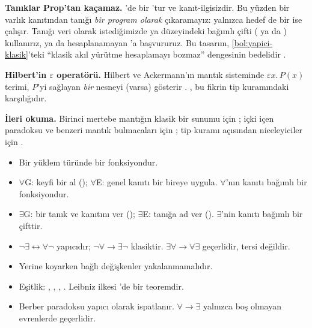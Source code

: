 \begin{arastirmanotu}
\textbf{Tanıklar Prop'tan kaçamaz.} \Lean{}'de  bir
'tur ve  kanıt-ilgisizdir. Bu yüzden bir varlık
kanıtından tanığı \emph{bir program olarak} çıkaramayız: 
yalnızca hedef de bir  ise çalışır. Tanığı veri olarak
istediğimizde ya  düzeyindeki bağımlı çifti ( ya da
) kullanırız, ya da hesaplanamayan
'a başvururuz. Bu tasarım, \cref{bol:yapici-klasik}'teki
``klasik akıl yürütme hesaplamayı bozmaz'' dengesinin bedelidir
\citep{carneiro2019}.

\textbf{Hilbert'in $\varepsilon$ operatörü.} Hilbert ve Ackermann'ın
mantık sisteminde $\varepsilon x.\,P(x)$ terimi, $P$'yi sağlayan
\emph{bir} nesneyi (varsa) gösterir \citep{hilbert1928}.
, bu fikrin tip kuramındaki karşılığıdır.

\textbf{İleri okuma.} Birinci mertebe mantığın klasik bir sunumu için
\citet{vandalen2013}; içki içen paradoksu ve benzeri mantık bulmacaları
için \citet{smullyan1978}; tip kuramı açısından niceleyiciler için
\citet{nederpelt2014}.
\end{arastirmanotu}

\begin{bolumozeti}
\begin{itemize}
  \item Bir yüklem  türünde bir fonksiyondur.
  \item $\forall$G: keyfi bir  al (); $\forall$E:
        genel kanıtı bir bireye uygula. $\forall$'nın kanıtı bağımlı bir
        fonksiyondur.
  \item $\exists$G: bir tanık ve kanıtını ver (); $\exists$E:
        tanığa ad ver (). $\exists$'nin kanıtı bağımlı
        bir çifttir.
  \item $\neg\exists \leftrightarrow \forall\neg$ yapıcıdır;
        $\neg\forall \to \exists\neg$ klasiktir. $\exists\forall \to
        \forall\exists$ geçerlidir, tersi değildir.
  \item Yerine koyarken bağlı değişkenler yakalanmamalıdır.
  \item Eşitlik: , , , . Leibniz ilkesi
        \Lean{}'de bir teoremdir.
  \item Berber paradoksu yapıcı olarak ispatlanır. $\forall \to \exists$
        yalnızca boş olmayan evrenlerde geçerlidir.
\end{itemize}
\end{bolumozeti}

